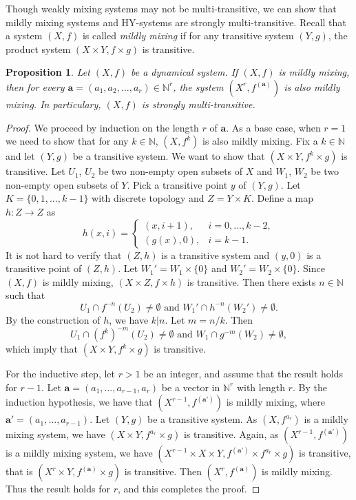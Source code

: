 \documentclass[12pt,a4paper]{amsart}
\newtheorem{prop}[thm]{Proposition}
\theoremstyle{definition}
\numberwithin{equation}{section}
\begin{document}
Though weakly mixing systems may not be multi-transitive, we can show
that mildly mixing systems and HY-systems are strongly multi-transitive.
Recall that a system $(X,f)$ is called \emph{mildly mixing}
if for any transitive system $(Y,g)$, the product system $(X\times Y,f\times g)$
is transitive.

\begin{prop}
Let $(X,f)$ be a dynamical system.
If $(X,f)$ is mildly mixing, then for every $\mathbf{a}=(a_1,a_2,\dotsc,a_r)\in\mathbb{N}^r$,
the system $(X^r,f^{(\mathbf{a})})$ is also mildly mixing.
In particulary, $(X,f)$ is strongly multi-transitive.
\end{prop}
\begin{proof}
We proceed by induction on the length $r$ of $\mathbf{a}$.
As a base case, when $r=1$ we need to show that for any $k\in\mathbb{N}$, $(X,f^k)$ is also mildly mixing.
Fix a $k\in\mathbb{N}$ and let $(Y,g)$ be a transitive system.
We want to show that  $(X\times Y,f^k\times g)$ is transitive.
Let $U_1$, $U_2$ be two non-empty open subsets of $X$ and $W_1$,  $W_2$ be two non-empty open subsets of $Y$.
Pick a transitive point $y$ of $(Y,g)$.
Let $K=\{0,1,\dotsc,k-1\}$ with discrete topology and $Z=Y\times K$. Define a map $h: Z\to Z$ as
\[h(x,i)=\begin{cases}
  (x,i+1),& i=0,\dots,k-2,\\
  (g(x),0),& i=k-1.
\end{cases}
\]
It is not hard to verify that $(Z, h)$ is a transitive system and $(y,0)$ is a transitive point of $(Z, h)$.
Let $W_1'=W_1\times \{0\}$ and $W_2'=W_2\times \{0\}$.
Since $(X,f)$ is mildly mixing, $(X\times Z,f\times h)$ is transitive.
Then there exists $n\in\mathbb{N}$ such that
\[U_1\cap f^{-n}(U_2)\neq\emptyset \text{ and }
W_1'\cap h^{-n}(W_2')\neq\emptyset.\]
By the construction of $h$, we have $k|n$. Let $m=n/k$. Then
\[U_1\cap (f^k)^{-m}(U_2)\neq\emptyset \text{ and }
W_1\cap g^{-m}(W_2)\neq\emptyset,\]
which  imply  that $(X\times Y,f^k\times g)$ is transitive.

For the inductive step, let $r > 1$ be an integer, and assume that the result holds for $r-1$.
Let $\mathbf{a}=(a_1,\dotsc,a_{r-1},a_r)$ be a vector in $\mathbb{N}^r$ with length $r$.
By the induction hypothesis, we have that $(X^{r-1},f^{(\mathbf{a}')})$ is mildly mixing,
where $\mathbf{a'}=(a_1,\dotsc,a_{r-1})$.
Let $(Y,g)$ be a transitive system.
As $(X,f^{a_r})$ is a mildly mixing system, we have $(X\times Y,f^{a_r}\times g)$ is transitive.
Again, as $(X^{r-1},f^{(\mathbf{a}')})$ is a mildly mixing system,
we have $(X^{r-1}\times X \times Y,f^{(\mathbf{a}')}\times f^{a_r}\times g)$ is transitive,
that is $(X^r\times Y,f^{(\mathbf{a})}\times g)$ is transitive.
Then $(X^r,f^{(\mathbf{a})})$ is mildly mixing.
Thus the result holds for $r$, and this completes the proof.
\end{proof}
\end{document}
